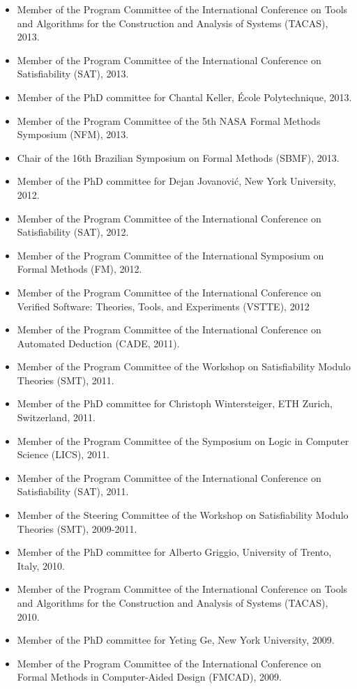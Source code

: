 \documentclass{article}
\begin{document}
\begin{itemize}
\item Member of the Program Committee of the International Conference on Tools and Algorithms for the Construction and Analysis of Systems (TACAS), 2013.
\item Member of the Program Committee of the International Conference on Satisfiability (SAT), 2013.
\item Member of the PhD committee for Chantal Keller, \'{E}cole Polytechnique, 2013.
\item Member of the Program Committee of the 5th NASA Formal Methods Symposium (NFM), 2013.
\item Chair of the 16th Brazilian Symposium on Formal Methods (SBMF), 2013.
\item Member of the PhD committee for Dejan Jovanovi\'{c}, New York University, 2012.
\item Member of the Program Committee of the International Conference on Satisfiability (SAT), 2012.
\item Member of the Program Committee of the International Symposium on Formal Methods (FM), 2012.
\item Member of the Program Committee of the International Conference on Verified Software: Theories, Tools, and Experiments (VSTTE), 2012
\item Member of the Program Committee of the International Conference on Automated Deduction (CADE, 2011).
\item Member of the Program Committee of the Workshop on Satisfiability Modulo Theories (SMT), 2011.
\item Member of the PhD committee for Christoph Wintersteiger, ETH Zurich, Switzerland, 2011.
\item Member of the Program Committee of the Symposium on Logic in Computer Science (LICS), 2011.
\item Member of the Program Committee of the International Conference on Satisfiability (SAT), 2011.
\item Member of the Steering Committee of the Workshop on Satisfiability Modulo Theories (SMT), 2009-2011.
\item Member of the PhD committee for Alberto Griggio, University of Trento, Italy, 2010.
\item Member of the Program Committee of the International Conference on Tools and Algorithms for the Construction and Analysis of Systems (TACAS), 2010.
\item Member of the PhD committee for Yeting Ge, New York University, 2009.
\item Member of the Program Committee of the International Conference on Formal Methods in Computer-Aided Design (FMCAD), 2009.

\end{itemize}
\end{document}
